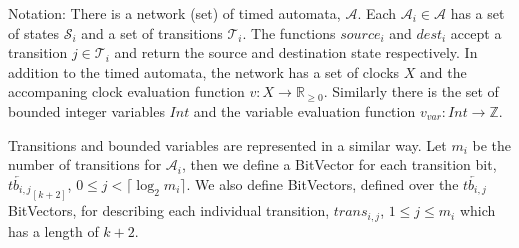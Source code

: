 \documentclass[a4paper,11pt]{article}
\begin{document}
Notation: There is a network (set) of timed automata, \(\mathcal{A}\). Each
\(\mathcal{A}_i \in \mathcal{A}\) has a set of states \(\mathcal{S}_i\) and a
set of transitions \(\mathcal{T}_i\). The functions \(source_i\) and \(dest_i\)
accept a transition \(j \in \mathcal{T}_i\) and return the source and
destination state respectively. In addition to the timed automata, the network
has a set of clocks \(X\) and the accompaning clock evaluation function \(v: X
\rightarrow \mathbb{R}_{\geq 0}\). Similarly there is the set of bounded integer
variables \(Int\) and the variable evaluation function \(v_{var}: Int
\rightarrow \mathbb{Z}\).

Transitions and bounded variables are represented in a similar way. Let \(m_i\)
be the number of transitions for \(\mathcal{A}_i\), then we define a BitVector
for each transition bit, \(\overleftarrow{tb_{i,j}}_{[k+2]}\), \(0 \leq j <
\lceil \log_2 m_i \rceil\). We also define BitVectors, defined over the
\(\overleftarrow{tb_{i,j}}\) BitVectors, for describing each individual
transition, \(trans_{i,j}\), \(1 \leq j \leq m_i\) which has a length of
\(k+2\).
\end{document}
